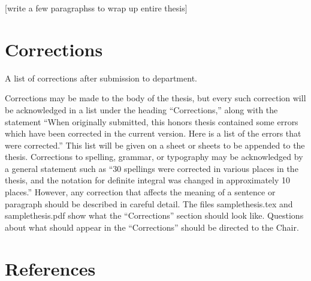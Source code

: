 \documentclass[12pt, twoside]{amherstthesis}
\begin{document}
{[}write a few paragraphss to wrap up entire thesis{]}

\hypertarget{corrections}{%
\chapter*{Corrections}\label{corrections}}

A list of corrections after submission to department.

Corrections may be made to the body of the thesis, but every such correction will be acknowledged in a list under the heading ``Corrections,'' along with the statement ``When originally submitted, this honors thesis contained some errors which have been corrected in the current version. Here is a list of the errors that were corrected.'' This list will be given on a sheet or sheets to be appended to the thesis. Corrections to spelling, grammar, or typography may be acknowledged by a general statement such as ``30 spellings were corrected in various places in the thesis, and the notation for definite integral was changed in approximately 10 places.'' However, any correction that affects the meaning of a sentence or paragraph should be described in careful detail. The files samplethesis.tex and samplethesis.pdf show what the ``Corrections'' section should look like. Questions about what should appear in the ``Corrections'' should be directed to the Chair.

\backmatter

\hypertarget{references}{%
\chapter*{References}\label{references}}

\noindent

\setlength{\parindent}{-0.20in}
\setlength{\leftskip}{0.20in}
\setlength{\parskip}{8pt}
\end{document}
